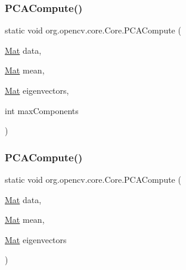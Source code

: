 \subsubsection{\texorpdfstring{P\+C\+A\+Compute()}{PCACompute()}\hspace{0.1cm}{\footnotesize\ttfamily [1/2]}}
{\footnotesize\ttfamily static void org.\+opencv.\+core.\+Core.\+P\+C\+A\+Compute (\begin{DoxyParamCaption}\item[{\mbox{\hyperlink{classorg_1_1opencv_1_1core_1_1_mat}{Mat}}}]{data,  }\item[{\mbox{\hyperlink{classorg_1_1opencv_1_1core_1_1_mat}{Mat}}}]{mean,  }\item[{\mbox{\hyperlink{classorg_1_1opencv_1_1core_1_1_mat}{Mat}}}]{eigenvectors,  }\item[{int}]{max\+Components }\end{DoxyParamCaption})\hspace{0.3cm}{\ttfamily [static]}}

\mbox{\label{classorg_1_1opencv_1_1core_1_1_core_aa77b57fe39b738ce2260e77c84405e73}} 
\subsubsection{\texorpdfstring{P\+C\+A\+Compute()}{PCACompute()}\hspace{0.1cm}{\footnotesize\ttfamily [2/2]}}
{\footnotesize\ttfamily static void org.\+opencv.\+core.\+Core.\+P\+C\+A\+Compute (\begin{DoxyParamCaption}\item[{\mbox{\hyperlink{classorg_1_1opencv_1_1core_1_1_mat}{Mat}}}]{data,  }\item[{\mbox{\hyperlink{classorg_1_1opencv_1_1core_1_1_mat}{Mat}}}]{mean,  }\item[{\mbox{\hyperlink{classorg_1_1opencv_1_1core_1_1_mat}{Mat}}}]{eigenvectors }\end{DoxyParamCaption})\hspace{0.3cm}{\ttfamily [static]}}

\mbox{\label{classorg_1_1opencv_1_1core_1_1_core_a05764d4479aec67351a6c96915053333}} 
